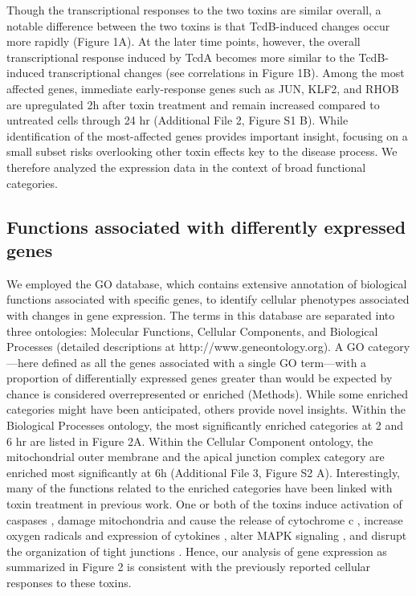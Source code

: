 \begin{figure}[h!]
  \centering
  \label{bmc:fig1}
\end{figure}


Though the transcriptional responses to the two toxins are similar overall, a notable difference between the two toxins is that TcdB-induced changes occur more rapidly (Figure 1A). At the later time points, however, the overall transcriptional response induced by TcdA becomes more similar to the TcdB-induced transcriptional changes (see correlations in Figure 1B). Among the most affected genes, immediate early-response genes such as JUN, KLF2, and RHOB are upregulated 2h after toxin treatment and remain increased compared to untreated cells through 24 hr (Additional File 2, Figure S1 B). While identification of the most-affected genes provides important insight, focusing on a small subset risks overlooking other toxin effects key to the disease process. We therefore analyzed the expression data in the context of broad functional categories.

\subsection{Functions associated with differently expressed genes}

We employed the GO database, which contains extensive annotation of biological functions associated with specific genes, to identify cellular phenotypes associated with changes in gene expression. The terms in this database are separated into three ontologies: Molecular Functions, Cellular Components, and Biological Processes (detailed descriptions at http://www.geneontology.org). A GO category—here defined as all the genes associated with a single GO term—with a proportion of differentially expressed genes greater than would be expected by chance is considered overrepresented or enriched (Methods). While some enriched categories might have been anticipated, others provide novel insights. Within the Biological Processes ontology, the most significantly enriched categories at 2 and 6 hr are listed in Figure 2A. Within the Cellular Component ontology, the mitochondrial outer membrane and the apical junction complex category are enriched most significantly at 6h (Additional File 3, Figure S2 A). Interestingly, many of the functions related to the enriched categories have been linked with toxin treatment in previous work. One or both of the toxins induce activation of caspases \cite{Gerhard:2008wz, QaaposDan:2002uj, Carneiro:2006cw, Brito:2002ky}, damage mitochondria and cause the release of cytochrome c \cite{Matarrese:2007ix, He:2000uc}, increase oxygen radicals and expression of cytokines \cite{He:2002cl,Qiu:1999us,Flegel:1991ws}, alter MAPK signaling \cite{Meyer:2007kj,Lee:2007gj,Na:2005bx}, and disrupt the organization of tight junctions \cite{Nusrat:2001cs}. Hence, our analysis of gene expression as summarized in Figure 2 is consistent with the previously reported cellular responses to these toxins.

